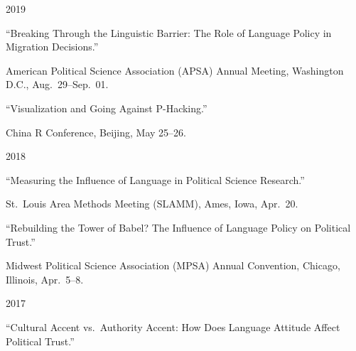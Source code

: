 \documentclass[10.5pt,]{article}
\providecommand{\tightlist}{%
	\setlength{\itemsep}{0pt}\setlength{\parskip}{0pt}}
\renewenvironment{itemize}{
	\begin{list}{}{
			\setlength{\leftmargin}{1.5em}
		}
	}{
	\end{list}
}
\begin{document}
\begin{itemize}
\tightlist
\item
  2019

  \begin{itemize}
  \tightlist
  \item
    ``Breaking Through the Linguistic Barrier: The Role of Language
    Policy in Migration Decisions.''

    \begin{itemize}
    \tightlist
    \item
      \footnotesize American Political Science Association (APSA) Annual
      Meeting, Washington D.C., Aug.~29--Sep.~01.
    \end{itemize}
  \item
    ``Visualization and Going Against P-Hacking.''

    \begin{itemize}
    \tightlist
    \item
      \footnotesize China R Conference, Beijing, May 25--26.
    \end{itemize}
  \end{itemize}
\item
  2018

  \begin{itemize}
  \tightlist
  \item
    ``Measuring the Influence of Language in Political Science
    Research.''

    \begin{itemize}
    \tightlist
    \item
      \footnotesize St.~Louis Area Methods Meeting (SLAMM), Ames, Iowa,
      Apr.~20.
    \end{itemize}
  \item
    ``Rebuilding the Tower of Babel? The Influence of Language Policy on
    Political Trust.''

    \begin{itemize}
    \tightlist
    \item
      \footnotesize Midwest Political Science Association (MPSA) Annual
      Convention, Chicago, Illinois, Apr.~5--8.
    \end{itemize}
  \end{itemize}
\item
  2017

  \begin{itemize}
  \tightlist
  \item
    ``Cultural Accent vs.~Authority Accent: How Does Language Attitude
    Affect Political Trust.''


\end{itemize}
\end{itemize}
\end{document}
